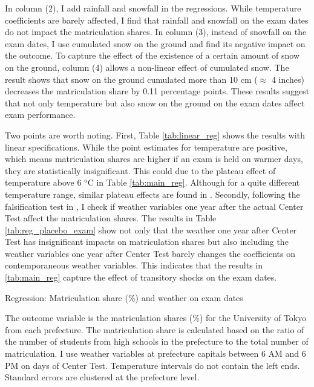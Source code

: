 \documentclass[12pt,letterpaper]{article}
\begin{document}
In column (2), I add rainfall and snowfall in the regressions.
While temperature coefficients are barely affected, I find that rainfall and snowfall on the exam dates do not impact the matriculation shares.
In column (3), instead of snowfall on the exam dates, I use cumulated snow on the ground and find its negative impact on the outcome. 
To capture the effect of the existence of a certain amount of snow on the ground, column (4) allows a non-linear effect of cumulated snow.
The result shows that snow on the ground cumulated more than 10 cm ($\approx$ 4 inches) decreases the matriculation share by 0.11 percentage points.
These results suggest that not only temperature but also snow on the ground on the exam dates affect exam performance.

Two points are worth noting.
First, Table \ref{tab:linear_reg} shows the results with linear specifications.
While the point estimates for temperature are positive, which means matriculation shares are higher if an exam is held on warmer days, they are statistically insignificant. 
This could due to the plateau effect of temperature above 6 $^o$C in Table \ref{tab:main_reg}.
Although for a quite different temperature range, similar plateau effects are found in \citet{Park2020a}.
Secondly, following the falsification test in \citet{Cho2017}, I check if weather variables one year after the actual Center Test affect the matriculation shares.
The results in Table \ref{tab:reg_placebo_exam} show not only that the weather one year after Center Test has insignificant impacts on matriculation shares but also including the weather variables one year after Center Test barely changes the coefficients on contemporaneous weather variables.
This indicates that the results in \ref{tab:main_reg} capture the effect of transitory shocks on the exam dates.

\begin{table}[H]
  \center
  \caption{Regression: Matriculation share (\%) and weather on exam dates}
  \footnotesize
  
  \label{tab:main_reg}
  \small
  \begin{tablenotes}
    \item
      The outcome variable is the matriculation shares (\%) for the University of Tokyo from each prefecture.
      The matriculation share is calculated based on the ratio of the number of students from high schools in the prefecture to the total number of matriculation.
      I use weather variables at prefecture capitals between 6 AM and 6 PM on days of Center Test.
      Temperature intervals do not contain the left ends.
      Standard errors are clustered at the prefecture level.
  \end{tablenotes}
\end{table}
\end{document}

